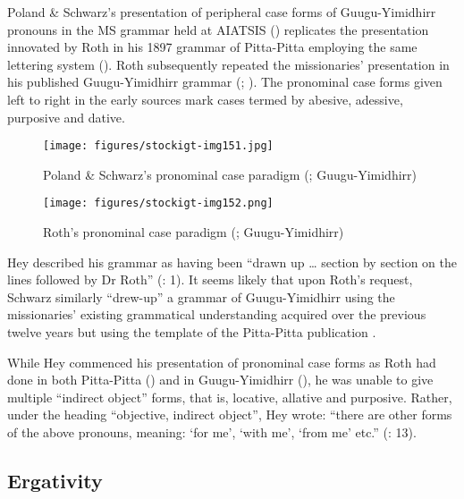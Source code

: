 Poland \& Schwarz’s presentation of peripheral case forms of Guugu-Yimidhirr pronouns in the MS grammar held at AIATSIS () replicates the presentation innovated by Roth in his 1897 grammar of Pitta-Pitta employing the same lettering system (). Roth subsequently repeated the missionaries' presentation in his published Guugu-Yimidhirr grammar (\citeyear{roth_structure_1901}; ). The pronominal case forms given left to right in the early sources mark cases termed by \citet[66]{haviland_guugu_1979} abesive, adessive, purposive and dative.


\begin{figure}
\texttt{[image: figures/stockigt-img151.jpg]}
\caption{Poland \& Schwarz’s pronominal case paradigm (\citeyear[no pag.]{schwarz_koko_1900}; Guugu-Yimidhirr)}
\label{bkm:Ref323828418}
\label{fig:key:206}
\end{figure}

\begin{figure}
\texttt{[image: figures/stockigt-img152.png]}
\caption{Roth's pronominal case paradigm (\citeyear[18]{roth_structure_1901}; Guugu-Yimidhirr)}
\label{bkm:Ref465432856}
\label{fig:key:207}
\end{figure}

Hey described his grammar as having been “drawn up … section by section on the lines followed by Dr Roth” (\citeyear{roth_structure_1901}: 1). It seems likely that upon Roth’s request, Schwarz similarly “drew-up” a grammar of Guugu-Yimidhirr using the missionaries' existing grammatical understanding acquired over the previous twelve years but using the template of the Pitta-Pitta publication \citeyearpar{roth_ethnological_1897}.

While Hey commenced his presentation of pronominal case forms as Roth had done in both Pitta-Pitta (\citeyear{roth_ethnological_1897}) and in Guugu-Yimidhirr (\citeyear{roth_structure_1901}), he was unable to give multiple ``indirect object'' forms, that is, locative, allative and purposive. Rather, under the heading ``objective, indirect object'', Hey wrote: “there are other forms of the above pronouns, meaning: `for me',  `with me', `from me' etc.” (\citeyear{hey_elementary_1903}: 13).

\subsection{Ergativity}
\label{sec:key:10.1.5}

